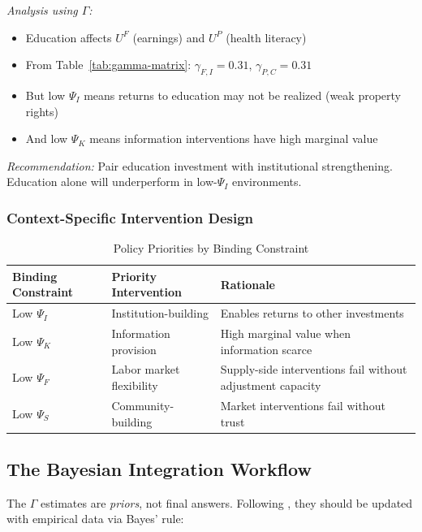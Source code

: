 \textit{Analysis using $\Gamma$:}
\begin{itemize}
  \item Education affects $U^F$ (earnings) and $U^P$ (health literacy)
  \item From Table~\ref{tab:gamma-matrix}: $\gamma_{F,I} = 0.31$, $\gamma_{P,C} = 0.31$
  \item But low $\Psi_I$ means returns to education may not be realized (weak property rights)
  \item And low $\Psi_K$ means information interventions have high marginal value
\end{itemize}

\textit{Recommendation:} Pair education investment with institutional strengthening.
Education alone will underperform in low-$\Psi_I$ environments.

\subsubsection{Context-Specific Intervention Design}

\begin{table}[htbp]
\centering
\caption{Policy Priorities by Binding Constraint}
\label{tab:policy-binding}
\small
\begin{tabular}{@{}lll@{}}
\toprule
\textbf{Binding Constraint} & \textbf{Priority Intervention} & \textbf{Rationale} \\
\midrule
Low $\Psi_I$ & Institution-building & Enables returns to other investments \\
Low $\Psi_K$ & Information provision & High marginal value when information scarce \\
Low $\Psi_F$ & Labor market flexibility & Supply-side interventions fail without adjustment capacity \\
Low $\Psi_S$ & Community-building & Market interventions fail without trust \\
\bottomrule
\end{tabular}
\end{table}

\subsection{The Bayesian Integration Workflow}

The $\Gamma$ estimates are \emph{priors}, not final answers. Following \citet{llmpriors2025scientific},
they should be updated with empirical data via Bayes' rule:

